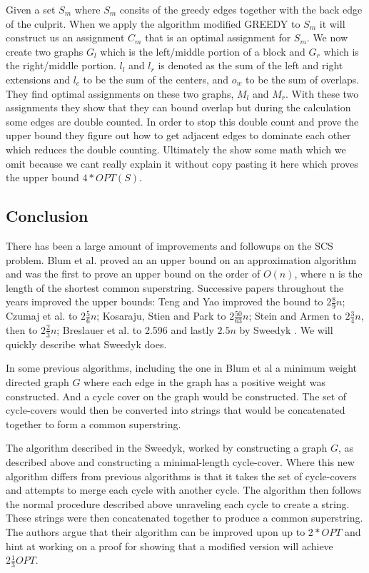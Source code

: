 \documentclass[letterpaper,11pt,titlepage]{article}
\begin{document}
Given a set $S_m$ where $S_m$ consits of the greedy edges together with the back edge of the culprit. When we apply the algorithm modified GREEDY to $S_m$ it will construct us an assignment $C_m$ that is an optimal assignment for $S_m$. We now create two graphs $G_l$ which is the left/middle portion of a block and $G_r$ which is the right/middle portion. $l_l$ and $l_r$ is denoted as the sum of the left and right extensions and $l_c$ to be the sum of the centers, and $o_w$ to be the sum of overlaps. They find optimal assignments on these two graphs, $M_l$ and $M_r$. With these two assignments they show that they can bound overlap but during the calculation some edges are double counted. In order to stop this double count and prove the upper bound they figure out how to get adjacent edges to dominate each other which reduces the double counting. Ultimately the show some math which we omit because we cant really explain it without copy pasting it here which proves the upper bound $4 * OPT(S)$.





\subsection{Conclusion}
There has been a large amount of improvements and followups on the SCS problem. Blum et al. proved an an upper bound on an approximation algorithm and was the first to prove an upper bound on the order of $O(n)$, where n is the length of the shortest common superstring. Successive papers throughout the years improved the upper bounds: Teng and Yao improved the bound to $2 \frac{8}{9} n$; Czumaj et al. to $2 \frac{5}{6} n$; Kosaraju, Stien and Park to $2 \frac{50}{63} n$; Stein and Armen to $2 \frac{3}{4} n$, then to $2 \frac{2}{3} n$; Breslauer et al. to 2.596 and lastly $2.5 n$ by Sweedyk \cite{sweedyk2000boldmath}. We will quickly describe what Sweedyk does.

In some previous algorithms, including the one in Blum et al a minimum weight directed graph $G$ where each edge in the graph has a positive weight was constructed. And a cycle cover on the graph would be constructed. The set of cycle-covers would then be converted into strings that would be concatenated together to form a common superstring.

The algorithm described in the Sweedyk, worked by constructing a graph $G$, as described above and constructing a minimal-length cycle-cover. Where this new algorithm differs from previous algorithms is that it takes the set of cycle-covers and attempts to merge each cycle with another cycle. 
The algorithm then follows the normal procedure described above unraveling each cycle to create a string. These strings were then concatenated together to produce a common superstring. The authors argue that their algorithm can be improved upon up to $2 * OPT$ and hint at working on a proof for showing that a modified version will achieve $2\frac{1}{3} OPT$.
\end{document}
